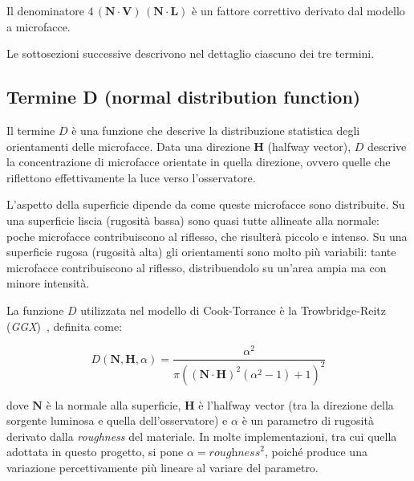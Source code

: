 \documentclass[12pt,a4paper,twoside]{book}
\begin{document}
Il denominatore $4 \, (\mathbf{N} \cdot \mathbf{V}) \, (\mathbf{N} \cdot \mathbf{L})$ è un fattore correttivo derivato dal modello a microfacce.

Le sottosezioni successive descrivono nel dettaglio ciascuno dei tre termini.

\subsection{Termine D (normal distribution function)}
\label{subsec:ggx}

Il termine $D$ è una funzione che descrive la distribuzione statistica degli orientamenti delle microfacce. Data una direzione $\mathbf{H}$ (halfway vector), $D$ descrive la concentrazione di microfacce orientate in quella direzione, ovvero quelle che riflettono effettivamente la luce verso l'osservatore.

L'aspetto della superficie dipende da come queste microfacce sono distribuite. Su una superficie liscia (rugosità bassa) sono quasi tutte allineate alla normale: poche microfacce contribuiscono al riflesso, che risulterà piccolo e intenso. Su una superficie rugosa (rugosità alta) gli orientamenti sono molto più variabili: tante microfacce contribuiscono al riflesso, distribuendolo su un'area ampia ma con minore intensità.

La funzione $D$ utilizzata nel modello di Cook-Torrance è la Trowbridge-Reitz (\textit{GGX})~\cite{walter2007}, definita come:

\begin{equation}
    D(\mathbf{N}, \mathbf{H}, \alpha) =
    \frac{\alpha^2}
    {\pi \left((\mathbf{N} \cdot \mathbf{H})^2 (\alpha^2 - 1) + 1\right)^2}
    \label{eq:ggx}
\end{equation}

dove $\mathbf{N}$ è la normale alla superficie, $\mathbf{H}$ è l'halfway vector (tra la direzione della sorgente luminosa e quella dell'osservatore) e $\alpha$ è un parametro di rugosità derivato dalla \textit{roughness} del materiale. In molte implementazioni, tra cui quella adottata in questo progetto, si pone $\alpha = \textit{roughness}^2$, poiché produce una variazione percettivamente più lineare al variare del parametro.
\end{document}

